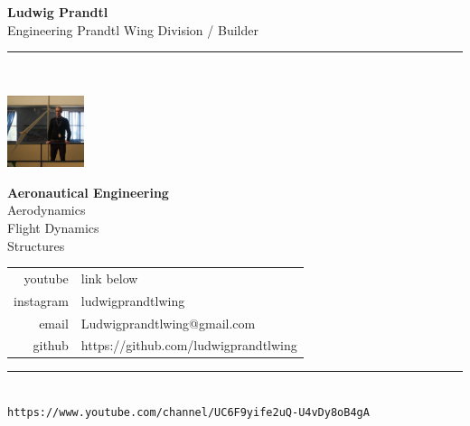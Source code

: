 \documentclass[11pt,a4paper]{memoir}
\begin{document}
    \begin{Spacing}{0.75}%
    \noindent
    \textbf{Ludwig Prandtl}\\
    \tiny Engineering \hfill {\color{gray}Prandtl Wing Division / Builder}\\ 
    \rule{74mm}{.3mm}\\
    \begin{minipage}[t]{22mm}
        \vspace{-0mm}%
        \includegraphics[height=21mm]{NoIdea.JPG}
    \end{minipage}
    \hspace{1mm}
    \begin{minipage}[t]{42mm}
        \vspace{-0mm}%
        \begin{flushleft}
        {\scriptsize
            \begin{Spacing}{1}%
            \textbf{Aeronautical Engineering}\\
            \hspace{5mm} Aerodynamics \\
            \hspace{5mm} Flight Dynamics \\
            \hspace{5mm} Structures \vspace{2mm}\\
            \end{Spacing}
        }
        {\tiny
        	\begin{tabular}{rl}
            	{\color{gray}youtube} & link below \\
            	{\color{gray}instagram} & ludwigprandtlwing \\
            	{\color{gray}email} & Ludwigprandtlwing@gmail.com \\
            	{\color{gray}github} & https://github.com/ludwigprandtlwing \\
            \end{tabular}
            \vspace*{2mm}
        }
        \end{flushleft}
    \end{minipage}
    \rule{74mm}{0mm}\\
    \texttt{\fontsize{2.5mm}{3.2mm}\selectfont https://www.youtube.com/channel/UC6F9yife2uQ-U4vDy8oB4gA } %
    \end{Spacing}
\end{document}
